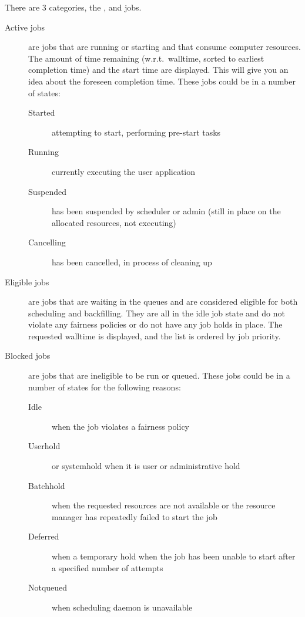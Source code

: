 \ifgent
\else
  There are 3 categories, the ,  and  jobs.
  
  \begin{description}
    \item[Active jobs] are jobs that are running or starting and that consume computer resources. The amount of time remaining (w.r.t.\ walltime, sorted to earliest completion time) and the start time are displayed. This will give you an idea about the foreseen completion time. These jobs could be in a number of states:
  
    \begin{description}
      \item[Started] attempting to start, performing pre-start tasks
      \item[Running] currently executing the user application
      \item[Suspended] has been suspended by scheduler or admin (still in place
        on the allocated resources, not executing)
      \item[Cancelling] has been cancelled, in process of cleaning up
    \end{description}
  
    \item[Eligible jobs] are jobs that are waiting in the queues and are
      considered eligible for both scheduling and backfilling.  They are all in
      the idle job state and do not violate any fairness policies or do not have
      any job holds in place. The requested walltime is displayed, and the list
      is ordered by job priority.
    \item[Blocked jobs] are jobs that are ineligible to be run or queued.  These
      jobs could be in a number of states for the following reasons:
  
    \begin{description}
      \item[Idle] when the job violates a fairness policy
      \item[Userhold] or systemhold when it is user or administrative hold
      \item[Batchhold] when the requested resources are not available or the resource manager has repeatedly failed to start the job
      \item[Deferred] when a temporary hold when the job has been unable to start after a specified number of attempts
      \item[Notqueued] when scheduling daemon is unavailable
    \end{description}
  \end{description}
\fi

